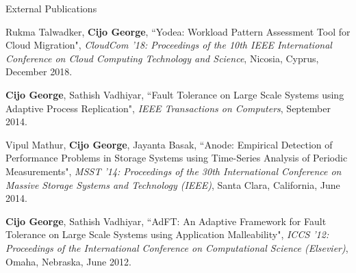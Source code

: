 \documentclass{resume} %
\begin{document}

\begin{rSection}{External Publications}

\begin{rPubPatContList}
\item Rukma Talwadker, {\bf Cijo George}, ``Yodea: Workload Pattern Assessment Tool for Cloud Migration", {\em CloudCom '18: Proceedings of the 10th IEEE International Conference on Cloud Computing Technology and Science}, Nicosia, Cyprus, December 2018.
\item {\bf Cijo George}, Sathish Vadhiyar, ``Fault Tolerance on Large Scale Systems using Adaptive Process Replication", {\em IEEE Transactions on Computers}, September 2014.
\item Vipul Mathur, {\bf Cijo George}, Jayanta Basak, ``Anode: Empirical Detection of Performance Problems in Storage Systems using Time-Series Analysis of Periodic Measurements", {\em MSST '14: Proceedings of the 30th International Conference on Massive Storage Systems and Technology (IEEE)}, Santa Clara, California, June 2014.
\item {\bf Cijo George}, Sathish Vadhiyar, ``AdFT: An Adaptive Framework for Fault Tolerance on Large Scale Systems using Application Malleability", {\em ICCS '12: Proceedings of the International Conference on Computational Science (Elsevier)}, Omaha, Nebraska, June 2012.
\end{rPubPatContList}
   
\end{rSection}

\end{document}
